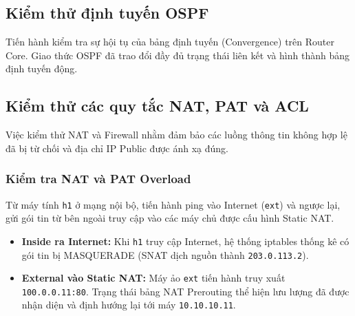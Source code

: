 \subsection{Kiểm thử định tuyến OSPF}
Tiến hành kiểm tra sự hội tụ của bảng định tuyến (Convergence) trên Router Core. Giao thức OSPF đã trao đổi đầy đủ trạng thái liên kết và hình thành bảng định tuyến động.


\subsection{Kiểm thử các quy tắc NAT, PAT và ACL}
Việc kiểm thử NAT và Firewall nhằm đảm bảo các luồng thông tin không hợp lệ đã bị từ chối và địa chỉ IP Public được ánh xạ đúng.

\subsubsection{Kiểm tra NAT và PAT Overload}
Từ máy tính \texttt{h1} ở mạng nội bộ, tiến hành ping vào Internet (\texttt{ext}) và ngược lại, gửi gói tin từ bên ngoài truy cập vào các máy chủ được cấu hình Static NAT.
\begin{itemize}
    \item \textbf{Inside ra Internet:} Khi \texttt{h1} truy cập Internet, hệ thống iptables thống kê có gói tin bị MASQUERADE (SNAT dịch nguồn thành \texttt{203.0.113.2}).
    \item \textbf{External vào Static NAT:} Máy ảo \texttt{ext} tiến hành truy xuất \texttt{100.0.0.11:80}. Trạng thái bảng NAT Prerouting thể hiện lưu lượng đã được nhận diện và định hướng lại tới máy \texttt{10.10.10.11}.
\end{itemize}


